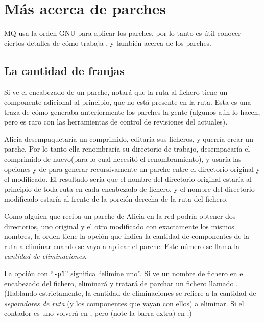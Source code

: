 \section{Más acerca de parches}
\label{sec:mq:adv-patch}

MQ usa la orden GNU  para aplicar los parches, por lo
tanto es útil conocer ciertos detalles de cómo trabaja
, y también acerca de los parches.

\subsection{La cantidad de franjas}

Si ve el encabezado de un parche, notará que la ruta al fichero tiene
un componente adicional al principio, que no está presente en la
ruta. Esta es una traza de cómo generaba anteriormente los parches la
gente (algunos aún lo hacen, pero es raro con las herramientas de
control de revisiones del actuales).

Alicia desempaquetaría un comprimido, editaría sus ficheros, y querría
crear un parche.  Por lo tanto ella renombraría su directorio de
trabajo, desempacaría el comprimido de nuevo(para lo cual necesitó el
renombramiento), y usaría las opciones  y
 de  para generar recursivamente un
parche entre el directorio original y el modificado.  El resultado
sería que el nombre del directorio original estaría al principio de
toda ruta en cada encabezado de fichero, y el nombre del directorio
modificado estaría al frente de la porción derecha de la ruta del
fichero.

Como alguien que reciba un parche de Alicia en la red podría obtener
dos directorios, uno original y el otro modificado con exactamente los
mismos nombres, la orden  tiene la opción
 que indica la cantidad de componentes de la ruta
a eliminar cuando se vaya a aplicar el parche.  Este número se
llama la \emph{cantidad de eliminaciones}.

La opción con ``\texttt{-p1}'' significa ``elimine uno''.  Si
 ve un nombre de fichero  en el
encabezado del fichero, eliminará  y tratará de parchar
un fichero llamado .  (Hablando estrictamente, la
cantidad de eliminaciones se refiere a la cantidad de \emph{separadores de
 ruta} (y los componentes que vayan con ellos) a eliminar.  Si el
contador es uno volverá  en , pero
 (note la barra extra) en .)

